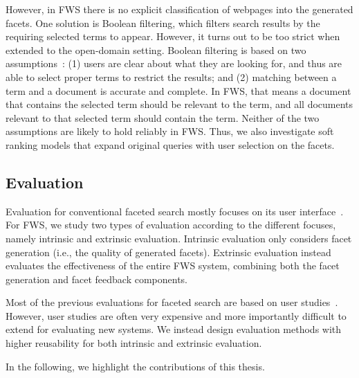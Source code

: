 However, in FWS there is no explicit classification of webpages into the generated facets. One solution is Boolean filtering, which filters search results by the requiring selected terms to appear. However, it turns out to be too strict when extended to the open-domain setting. Boolean filtering is based on two assumptions~\cite{zhang2010interactive}: (1) users are clear about what they are looking for, and thus are able to select proper terms to restrict the results; and (2) matching between a term and a document is accurate and complete. In FWS, that means a document that contains the selected term should be relevant to the term, and all documents relevant to that selected term should contain the term. Neither of the two assumptions are likely to hold reliably in FWS. Thus, we also investigate soft ranking models that expand original queries with user selection on the facets.
  

\subsection{Evaluation}
Evaluation for conventional faceted search mostly focuses on its user interface~\cite{burke1996knowledge,english2002hierarchical,hearst2006design,hearst2008uis,kules2009exploratory}. For FWS, we study two types of evaluation according to the different focuses, namely intrinsic and extrinsic evaluation. Intrinsic evaluation only considers facet generation (i.e., the quality of generated facets). Extrinsic evaluation instead evaluates the effectiveness of the entire FWS system, combining both the facet generation and facet feedback components.

Most of the previous evaluations for faceted search are based on user studies~\cite{dash2008dynamic,li2010facetedpedia,stoica2007automating}. However, user studies are often very expensive and more importantly difficult to extend for evaluating new systems. We instead design evaluation methods with higher reusability for both intrinsic and extrinsic evaluation.

In the following, we highlight the contributions of this thesis.
